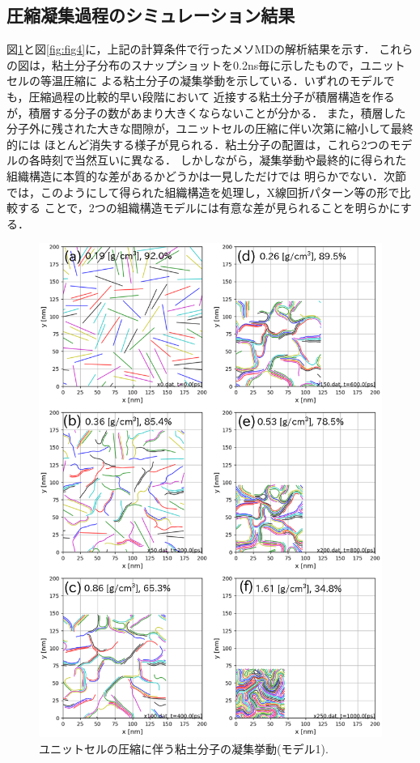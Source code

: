 \subsection{圧縮凝集過程のシミュレーション結果}
図\ref{fig:fig3}と図\ref{fig:fig4}に，上記の計算条件で行ったメソMDの解析結果を示す．
これらの図は，粘土分子分布のスナップショットを0.2ns毎に示したもので，ユニットセルの等温圧縮に
よる粘土分子の凝集挙動を示している．いずれのモデルでも，圧縮過程の比較的早い段階において
近接する粘土分子が積層構造を作るが，積層する分子の数があまり大きくならないことが分かる．
また，積層した分子外に残された大きな間隙が，ユニットセルの圧縮に伴い次第に縮小して最終的には
ほとんど消失する様子が見られる．粘土分子の配置は，これら2つのモデルの各時刻で当然互いに異なる．
しかしながら，凝集挙動や最終的に得られた組織構造に本質的な差があるかどうかは一見しただけでは
明らかでない．次節では，このようにして得られた組織構造を処理し，X線回折パターン等の形で比較する
ことで，2つの組織構造モデルには有意な差が見られることを明らかにする．
\begin{figure}[h]
	\begin{center}
	\includegraphics[width=1.0\linewidth]{Figs/fig3.eps} 
	\end{center}
	\caption{
		ユニットセルの圧縮に伴う粘土分子の凝集挙動(モデル1).
	} 
	\label{fig:fig3}
\end{figure}
